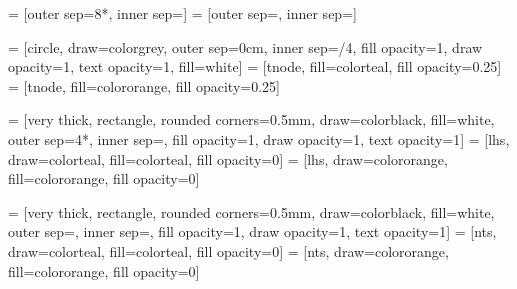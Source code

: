 \usepackage{tikz, pgfplots}
\usetikzlibrary{calc}
\usetikzlibrary{math}
\usetikzlibrary{shapes}
\usetikzlibrary{patterns}
\usetikzlibrary{backgrounds}
\usetikzlibrary{positioning}
\usetikzlibrary{decorations.pathmorphing}






 = [outer sep=8*\nodespacing, inner sep=\nodesize]
 = [outer sep=\nodespacing, inner sep=\nodesize]

 = [circle, draw=colorgrey, outer sep=0cm, inner sep=\nodesize/4, fill opacity=1, draw opacity=1, text opacity=1, fill=white]
 = [tnode, fill=colorteal, fill opacity=0.25]
 = [tnode, fill=colororange, fill opacity=0.25]

 = [very thick, rectangle, rounded corners=0.5mm, draw=colorblack, fill=white, outer sep=4*\nodespacing, inner sep=\nodesize,  fill opacity=1, draw opacity=1, text opacity=1]
 = [lhs, draw=colorteal, fill=colorteal, fill opacity=0]
 = [lhs, draw=colororange, fill=colororange, fill opacity=0]

 = [very thick, rectangle, rounded corners=0.5mm, draw=colorblack, fill=white, outer sep=\nodespacing, inner sep=\nodesize, fill opacity=1, draw opacity=1, text opacity=1]
 = [nts, draw=colorteal, fill=colorteal, fill opacity=0]
 = [nts, draw=colororange, fill=colororange, fill opacity=0]

